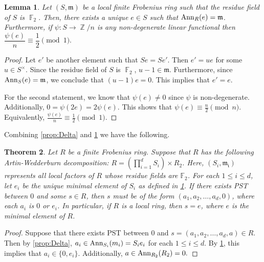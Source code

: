\documentclass[12pt, a4paper]{amsart}
\newtheorem{thm}{Theorem}[section]
\newtheorem{lem}[thm]{Lemma}
\theoremstyle{definition}
\DeclareMathOperator{\Z}{\mathbb{Z}}
\DeclareMathOperator{\F}{\mathbb{F}}
\newcommand{\Ann}{{\rm Ann}}
\numberwithin{equation}{section}
\begin{document}
\begin{lem} \label{lem:local}
    Let $(S, \mathfrak{m})$ be a local finite Frobenius ring such that the residue field of $S$ is $\F_2.$ Then, there exists a unique $e \in S$ such that $\Ann_{R}(e)=\mathfrak{m}$. Furthermore, if $\psi\colon S \to \Z/n$ is any non-degenerate linear functional then $\dfrac{\psi(e)}{n} \equiv \dfrac{1}{2} \pmod{1}.$ 
\end{lem}

\begin{proof}
    Let $e'$ be another element such that $Se=Se'.$ Then $e'=ue$ for some $u \in S^{\times}.$ Since the residue field of $S$ is $\F_2$, $u-1 \in \mathfrak{m}.$ Furthermore, since $\Ann_{S}(e)=\mathfrak{m}$, we conclude that $(u-1)e=0$. This implies that $e'=e.$


    For the second statement, we know that $\psi(e) \neq 0$ since $\psi$ is non-degenerate. Additionally, $0=\psi(2e)=2 \psi(e).$ This shows that $\psi(e) \equiv \frac{n}{2} \pmod{n}.$ Equivalently, $\frac{\psi(e)}{n} \equiv \frac{1}{2} \pmod{1}.$ 
\end{proof}

Combining \cref{prop:Delta} and \cref{lem:local} we have the following. 

\begin{thm} \label{prop:upper_bound}
Let $R$ be a finite Frobenius ring. Suppose that $R$ has the following Artin-Wedderburn decomposition: $R = (\prod_{i=1}^d S_i) \times R_2$. Here, $(S_i, \mathfrak{m_i})$ represents all local factors of $R$ whose residue fields are $\mathbb{F}_2$. For each $1 \leq i \leq d$, let $e_i$ be the unique minimal element of $S_i$ as defined in \cref{lem:local}. If there exists PST between $0$ and some $s \in R$, then $s$ must be of the form $(a_1, a_2, \ldots, a_d, 0)$, where each $a_i$ is $0$ or $e_i$. In particular, if $R$ is a local ring, then $s=e$, where $e$ is the minimal element of $R$. 
\end{thm}

\begin{proof}
    Suppose that there exists PST between $0$ and $s=(a_1, a_2, \ldots, a_d, a) \in R.$ Then by \cref{prop:Delta}, $a_i \in \Ann_{S_i}(m_i) = S_ie_i$ for each $1 \leq i \leq d.$ By \cref{lem:local}, this implies that $a_i \in \{0, e_i \}$. Additionally, $a \in \Ann_{R_2}(R_2)=0.$
\end{proof}
\end{document}
